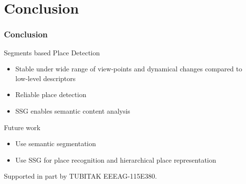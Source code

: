 \section{Conclusion}
\frame
{
	\frametitle{Conclusion}
	
	\begin{block}{Segments based Place Detection}
		\begin{itemize}
			\item Stable under wide range of view-points and dynamical changes compared to low-level descriptors
			\item Reliable place detection
			\item SSG enables semantic content analysis
		\end{itemize}
	\end{block}	
	
	\begin{block}{Future work}
		\begin{itemize}
			\item Use semantic segmentation
			\item Use SSG for place recognition and hierarchical place representation
		\end{itemize}
	\end{block}	

	\begin{block}{\small Supported in part by TUBITAK EEEAG-115E380.}	
		
		\end{block}	

}